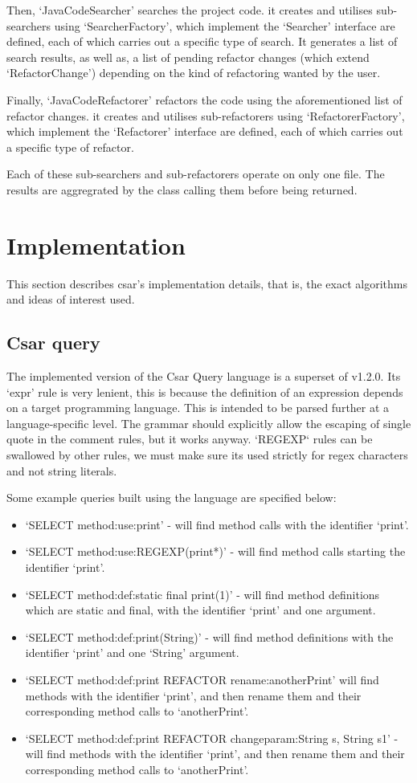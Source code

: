 \documentclass[12pt, letterpaper]{article}
\begin{document}
Then, `JavaCodeSearcher' searches the project code.
it creates and utilises sub-searchers using `SearcherFactory', which implement the `Searcher' interface are defined, each of which carries out a specific type of search.
It generates a list of search results, as well as, a list of pending refactor changes (which extend `RefactorChange') depending on the kind of refactoring wanted by the user.

Finally, `JavaCodeRefactorer' refactors the code using the aforementioned list of refactor changes.
it creates and utilises sub-refactorers using `RefactorerFactory', which implement the `Refactorer' interface are defined, each of which carries out a specific type of refactor.

Each of these sub-searchers and sub-refactorers operate on only one file.
The results are aggregrated by the class calling them before being returned.

\section{Implementation}
This section describes csar's implementation details, that is, the exact algorithms and ideas of interest used.

\subsection{Csar query}
The implemented version of the Csar Query language is a superset of v1.2.0.
Its `expr' rule is very lenient, this is because the definition of an expression depends on a target programming language. 
This is intended to be parsed further at a language-specific level.
The grammar should explicitly allow the escaping of single quote in the comment rules, but it works anyway.
`REGEXP` rules can be swallowed by other rules, we must make sure its used strictly for regex characters and not string literals.

Some example queries built using the language are specified below:
\begin{itemize}
  \item `SELECT method:use:print' - will find method calls with the identifier `print'.
  \item `SELECT method:use:REGEXP(print*)' - will find method calls starting the identifier `print'.
  \item `SELECT method:def:static final print(1)' - will find method definitions which are static and final, with the identifier `print' and one argument.
  \item `SELECT method:def:print(String)' - will find method definitions with the identifier `print' and one `String' argument.
  \item `SELECT method:def:print REFACTOR rename:anotherPrint' will find methods with the identifier `print', and then rename them and their corresponding method calls to `anotherPrint'.
  \item `SELECT method:def:print REFACTOR changeparam:String s, String s1' - will find methods with the identifier `print', and then rename them and their corresponding method calls to `anotherPrint'.
\end{itemize}
\end{document}
